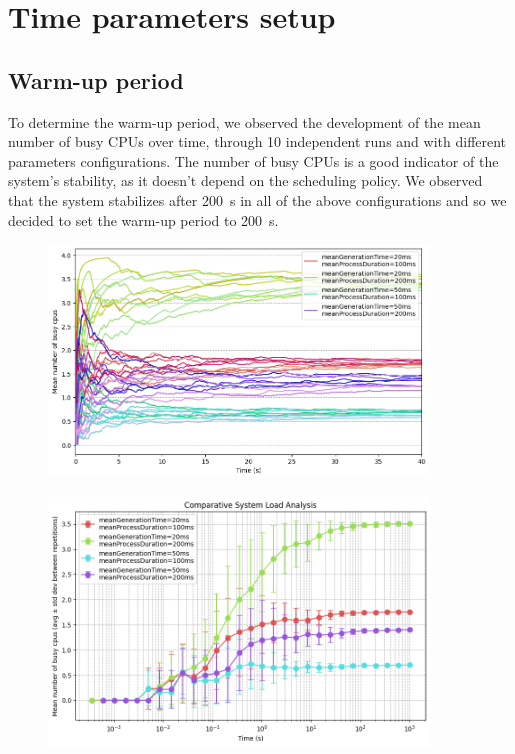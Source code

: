 \section{Time parameters setup}

\subsection{Warm-up period}

To determine the warm-up period, we observed the development of the mean number of busy CPUs over time, through 10 independent runs and with different parameters configurations. The number of busy CPUs is a good indicator of the system's stability, as it doesn't depend on the scheduling policy.
We observed that the system stabilizes after \SI{200}{\second} in all of the above configurations and so we decided to set the warm-up period to \SI{200}{\second}.

\begin{figure}[H]
    \captionsetup{type=figure}
    \centering
    \includegraphics[width=0.9\textwidth]{./images/04/lineWarmup.png}
    \label{fig:lineWarmup}
\end{figure}
\begin{figure}[h]
    \captionsetup{type=figure}
    \centering
    \includegraphics[width=0.9\textwidth]{./images/04/errorWarmup.png}
    \label{fig:errorWarmup}
\end{figure}



